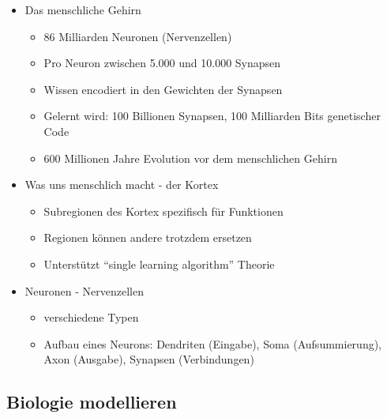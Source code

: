 \documentclass[paper=a4, fontsize=11pt]{scrartcl} %
\numberwithin{equation}{section} %
\numberwithin{figure}{section} %
\numberwithin{table}{section} %
\begin{document}
\begin{itemize}
\item Das menschliche Gehirn
\begin{itemize}
\item 86 Milliarden Neuronen (Nervenzellen)
\item Pro Neuron zwischen 5.000 und 10.000 Synapsen
\item Wissen encodiert in den Gewichten der Synapsen
\item Gelernt wird: 100 Billionen Synapsen, 100 Milliarden Bits genetischer Code
\item 600 Millionen Jahre Evolution vor dem menschlichen Gehirn
\end{itemize}
\item Was uns menschlich macht - der Kortex
\begin{itemize}
\item Subregionen des Kortex spezifisch für Funktionen
\item Regionen können andere trotzdem ersetzen
\item Unterstützt ``single learning algorithm'' Theorie
\end{itemize}
\item Neuronen - Nervenzellen
\begin{itemize}
\item verschiedene Typen
\item Aufbau eines Neurons: Dendriten (Eingabe), Soma (Aufsummierung), Axon (Ausgabe), Synapsen (Verbindungen)
\end{itemize}
\end{itemize}

\subsection{Biologie modellieren}
\end{document}
